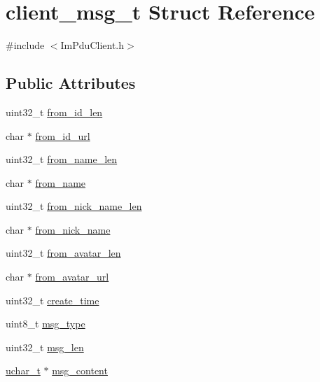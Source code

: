 \hypertarget{structclient__msg__t}{}\section{client\+\_\+msg\+\_\+t Struct Reference}
\label{structclient__msg__t}


{\ttfamily \#include $<$Im\+Pdu\+Client.\+h$>$}

\subsection*{Public Attributes}
\begin{DoxyCompactItemize}
\item 
uint32\+\_\+t \hyperlink{structclient__msg__t_a150d3b2d1fbcb31016bd796b1248a379}{from\+\_\+id\+\_\+len}
\item 
char $\ast$ \hyperlink{structclient__msg__t_afa07d899743f70aaadc18ad7142a6686}{from\+\_\+id\+\_\+url}
\item 
uint32\+\_\+t \hyperlink{structclient__msg__t_ac3cb93d18f82edadc6a41047fbe1ba21}{from\+\_\+name\+\_\+len}
\item 
char $\ast$ \hyperlink{structclient__msg__t_a2486c9a55c0ec734de5d4c886b755991}{from\+\_\+name}
\item 
uint32\+\_\+t \hyperlink{structclient__msg__t_ad258fd69f7591496f89f1b541111113a}{from\+\_\+nick\+\_\+name\+\_\+len}
\item 
char $\ast$ \hyperlink{structclient__msg__t_a5430acd8c8d9ec6f5021753a43888cbc}{from\+\_\+nick\+\_\+name}
\item 
uint32\+\_\+t \hyperlink{structclient__msg__t_a0b0621ecb3b2a68a1ea87cd23a74f680}{from\+\_\+avatar\+\_\+len}
\item 
char $\ast$ \hyperlink{structclient__msg__t_a1043292d195e35512c42e9916bbe4050}{from\+\_\+avatar\+\_\+url}
\item 
uint32\+\_\+t \hyperlink{structclient__msg__t_a6e308261f00a78b08cab0b1e15c72d52}{create\+\_\+time}
\item 
uint8\+\_\+t \hyperlink{structclient__msg__t_a2e29ac505ddff6b2fd10b75cb94118cd}{msg\+\_\+type}
\item 
uint32\+\_\+t \hyperlink{structclient__msg__t_aa3780ae7f4ffc9a99514d644d1a85091}{msg\+\_\+len}
\item 
\hyperlink{base_2ostype_8h_a124ea0f8f4a23a0a286b5582137f0b8d}{uchar\+\_\+t} $\ast$ \hyperlink{structclient__msg__t_a8e9c6d5cf95eb4aafb6b1985f33c1c3f}{msg\+\_\+content}
\end{DoxyCompactItemize}


